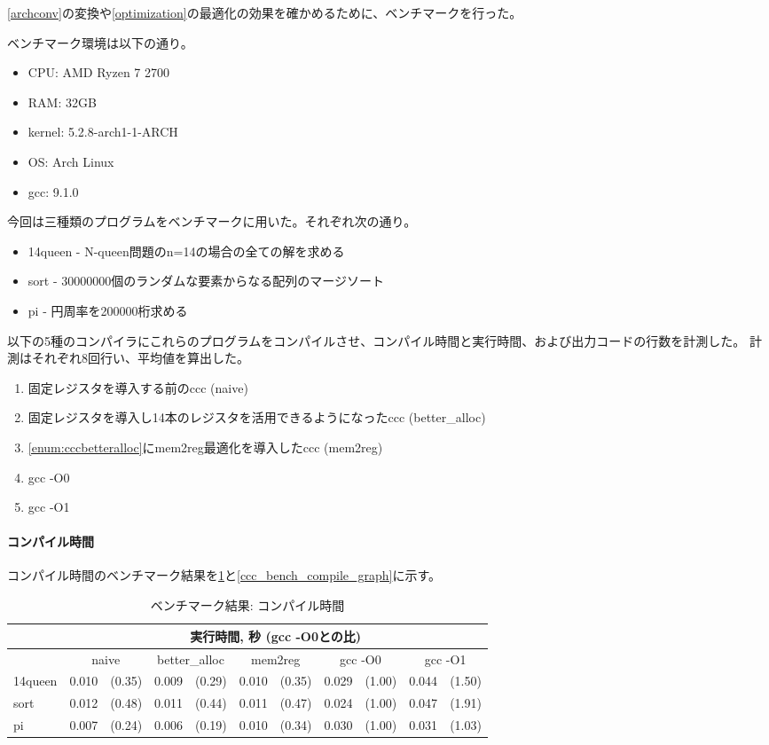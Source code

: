 \documentclass[../main.tex]{subfiles}
\begin{document}
\cref{archconv}の変換や\cref{optimization}の最適化の効果を確かめるために、ベンチマークを行った。

ベンチマーク環境は以下の通り。
\begin{itemize}
  \item CPU: AMD Ryzen 7 2700
  \item RAM: 32GB
  \item kernel: 5.2.8-arch1-1-ARCH
  \item OS: Arch Linux
  \item gcc: 9.1.0
\end{itemize}

今回は三種類のプログラムをベンチマークに用いた。それぞれ次の通り。
\begin{itemize}
  \item 14queen - N-queen問題のn=14の場合の全ての解を求める
  \item sort - 30000000個のランダムな要素からなる配列のマージソート
  \item pi - 円周率を200000桁求める
\end{itemize}

以下の5種のコンパイラにこれらのプログラムをコンパイルさせ、コンパイル時間と実行時間、および出力コードの行数を計測した。
計測はそれぞれ8回行い、平均値を算出した。

\begin{enumerate}
   \item 固定レジスタを導入する前のccc (naive)
   \item \label{enum:cccbetteralloc} 固定レジスタを導入し14本のレジスタを活用できるようになったccc (better\_alloc)
   \item \cref{enum:cccbetteralloc}にmem2reg最適化を導入したccc (mem2reg)
   \item gcc -O0
   \item gcc -O1
\end{enumerate}

\clearpage
\paragraph{コンパイル時間}

コンパイル時間のベンチマーク結果を\cref{ccc_bench_compile}と\cref{ccc_bench_compile_graph}に示す。

\begin{table}[h]
  \centering
  \begin{tabular}{l|rl|rl|rl|rl|rl}
    &\multicolumn{10}{c}{実行時間, 秒 (gcc -O0との比)} \\ \hline
    &\multicolumn{2}{c|}{naive}&\multicolumn{2}{c|}{better\_alloc}&\multicolumn{2}{c|}{mem2reg}&\multicolumn{2}{c|}{gcc -O0}&\multicolumn{2}{c}{gcc -O1} \\ \hline\hline
    14queen&0.010&(0.35)&0.009&(0.29)&0.010&(0.35)&0.029&(1.00)&0.044&(1.50) \\
    sort&0.012&(0.48)&0.011&(0.44)&0.011&(0.47)&0.024&(1.00)&0.047&(1.91) \\
    pi&0.007&(0.24)&0.006&(0.19)&0.010&(0.34)&0.030&(1.00)&0.031&(1.03) \\
  \end{tabular}
  \caption{ベンチマーク結果: コンパイル時間}
  \label{ccc_bench_compile}
\end{table}
\end{document}
